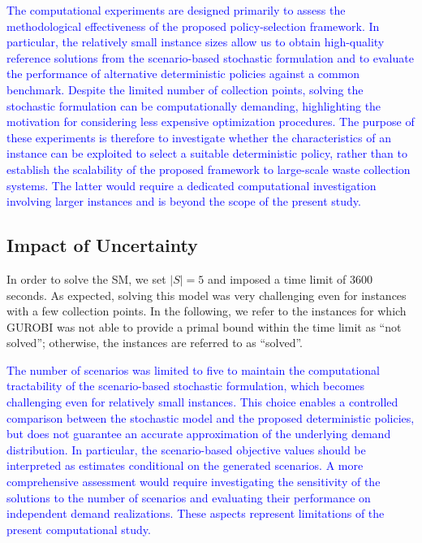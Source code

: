\documentclass[authoryear,preprint,12pt]{elsarticle}
\newcommand{\rev}[1]{\textcolor{blue}{{#1}}}
\begin{document}
\rev{The computational experiments are designed primarily to assess the methodological effectiveness of the proposed policy-selection framework. In particular, the relatively small instance sizes allow us to obtain high-quality reference solutions from the scenario-based stochastic formulation and to evaluate the performance of alternative deterministic policies against a common benchmark. Despite the limited number of collection points, solving the stochastic formulation can be computationally demanding, highlighting the motivation for considering less expensive optimization procedures. The purpose of these experiments is therefore to investigate whether the characteristics of an instance can be exploited to select a suitable deterministic policy, rather than to establish the scalability of the proposed framework to large-scale waste collection systems. The latter would require a dedicated computational investigation involving larger instances and is beyond the scope of the present study.}





\subsection{Impact of Uncertainty}\label{SSA}
In order to solve the SM, we set $|S|=5$ and imposed a time limit of 3600 seconds. As expected, solving this model was very challenging even for instances with a few collection points. In the following, we refer to the instances for which GUROBI was not able to provide a primal bound within the time limit as ``not solved''; otherwise, the instances are referred to as ``solved''.


\rev{The number of scenarios was limited to five to maintain the computational tractability of the scenario-based stochastic formulation, which becomes challenging even for relatively small instances. This choice enables a controlled comparison between the stochastic model and the proposed deterministic policies, but does not guarantee an accurate approximation of the underlying demand distribution. In particular, the scenario-based objective values should be interpreted as estimates conditional on the generated scenarios. A more comprehensive assessment would require investigating the sensitivity of the solutions to the number of scenarios and evaluating their performance on independent demand realizations. These aspects represent limitations of the present computational study.}
\end{document}
